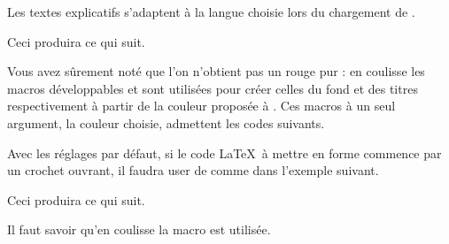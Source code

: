 \begin{tdocnote}
    Les textes explicatifs s'adaptent à la langue choisie lors du chargement de \thispack{}.
\end{tdocnote}




\begin{tdocexa}
    \leavevmode



    Ceci produira ce qui suit.

    \medskip

    

\end{tdocexa}


\begin{tdocnote}
    Vous avez sûrement noté que l'on n'obtient pas un rouge pur : en coulisse les macros développables  et  sont utilisées pour créer celles du fond et des titres respectivement à partir de la couleur proposée à .
    Ces macros à un seul argument, la couleur choisie, admettent les codes suivants.

    \begin{tdoclatex}[code]
    \end{tdoclatex}
\end{tdocnote}




\begin{tdocwarn}
    Avec les réglages par défaut, si le code \LaTeX\ à mettre en forme commence par un crochet ouvrant, il faudra user de  comme dans l'exemple suivant.



    Ceci produira ce qui suit.

    \medskip

    

\end{tdocwarn}


\begin{tdocnote}
    Il faut savoir qu'en coulisse la macro  est utilisée.

    \begin{tdoclatex}[std]
    \end{tdoclatex}
\end{tdocnote}


